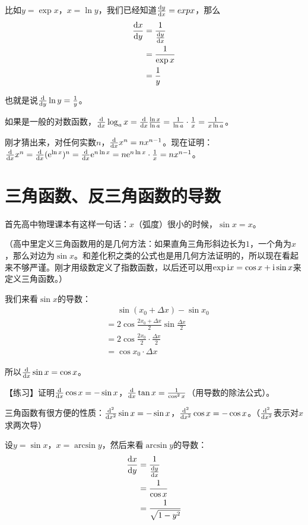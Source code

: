 比如$y=\exp x$，$x=\ln y$，我们已经知道$\frac{\opd y}{\opd x}=exp x$，那么
\begin{align*}
\frac{\opd x}{\opd y}&=\frac{1}{\frac{\opd y}{\opd x}} \\
&=\frac{1}{\exp x} \\
&=\frac{1}{y}
\end{align*}

也就是说$\ddy \ln y=\frac{1}{y}$。

如果是一般的对数函数，$\ddx \log_a x=\ddx \frac{\ln x}{\ln a}=\frac{1}{\ln a} \cdot \frac{1}{x}=\frac{1}{x \ln a}$。

刚才猜出来，对任何实数$n$，$\ddx x^n=n x^{n-1}$。现在证明：$\ddx x^n=\ddx (\rme^{\ln x})^n=\ddx \rme^{n \ln x}=n \rme^{n \ln x} \cdot \frac{1}{x}=n x^{n-1}$。

\section{三角函数、反三角函数的导数}

首先高中物理课本有这样一句话：$x$（弧度）很小的时候，$\sin x=x$。

（高中里定义三角函数用的是几何方法：如果直角三角形斜边长为$1$，一个角为$x$，那么对边为$\sin x$。和差化积之类的公式也是用几何方法证明的，所以现在看起来不够严谨。刚才用级数定义了指数函数，以后还可以用$\exp \rmi x=\cos x+\rmi \sin x$来定义三角函数。）

我们来看$\sin x$的导数：
\begin{align*}
&\mathrel{\phantom{=}}\sin(x_0+\Delta x)-\sin x_0 \\
&=2 \cos \frac{2x_0+\Delta x}{2} \sin \frac{\Delta x}{2} \\
&=2 \cos \frac{2x_0}{2} \cdot \frac{\Delta x}{2} \\
&=\cos x_0 \cdot \Delta x
\end{align*}

所以$\ddx \sin x=\cos x$。

【练习】证明$\ddx \cos x=-\sin x$，$\ddx \tan x=\frac{1}{\cos^2 x}$（用导数的除法公式）。

三角函数有很方便的性质：$\frac{\mathrm{d^2}}{\opd x^2}\sin x=-\sin x$，$\frac{\mathrm{d^2}}{\opd x^2}\cos x=-\cos x$。（$\frac{\mathrm{d^2}}{\opd x^2}$表示对$x$求两次导）

设$y=\sin x$，$x=\arcsin y$，然后来看$\arcsin y$的导数：
\begin{align*}
\frac{\opd x}{\opd y}&=\frac{1}{\frac{\opd y}{\opd x}} \\
&=\frac{1}{\cos x} \\
&=\frac{1}{\sqrt{1-y^2}}
\end{align*}

